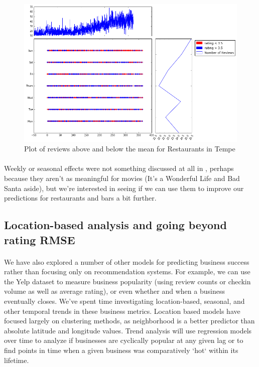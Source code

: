 \documentclass[11pt]{article}
\begin{document}
\begin{figure}[H]
\centering
\includegraphics[keepaspectratio=true,scale=0.4]{./images/tempe_restaurants}
\caption{Plot of reviews above and below the mean for Restaurants in Tempe}\label{fg:tempe}
\end{figure}

\paragraph{} Weekly or seasonal effects were not something discussed at all in \cite{koren}, perhaps because they aren't as meaningful for movies (It's a Wonderful Life and Bad Santa aside), but we're interested in seeing if we can use them to improve our predictions for restaurants and bars a bit further.

\subsection*{Location-based analysis and going beyond rating RMSE}

\paragraph{} We have also explored a number of other models for predicting business success rather than focusing only on recommendation systems. For example, we can use the Yelp dataset to measure business popularity (using review counts or checkin volume as well as average rating), or even whether and when a business eventually closes. We've spent time investigating location-based, seasonal, and other temporal trends in these business metrics. Location based models have focused largely on clustering methods, as neighborhood is a better predictor than absolute latitude and longitude values. Trend analysis will use regression models over time to analyze if businesses are cyclically popular at any given lag or to find points in time when a given business was comparatively `hot` within its lifetime.
\end{document}
